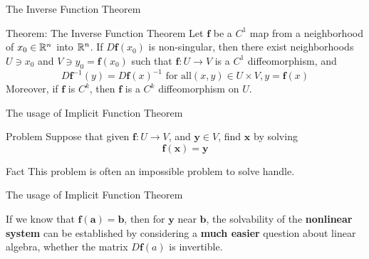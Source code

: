 \begin{frame}{The Inverse Function Theorem}
    \begin{block}{Theorem: The Inverse Function Theorem}
        Let $\mathbf{f}$ be a $C^1$ map from a neighborhood of $x_0 \in \mathbb{R}^n$ into $\mathbb{R}^n$. If $D\mathbf{f}(x_0)$ is non-singular, then there exist neighborhoods $U \ni x_0$ and $V \ni y_0 = \mathbf{f}(x_0)$ such that $ \mathbf{f} : U \rightarrow V$ is a $C^1$ diffeomorphism\footnotemark, and 
        \begin{equation}
            D\mathbf{f}^{-1}(y) = D\mathbf{f}(x)^{-1} \text{ for all} (x, y) \in U \times V, y = \mathbf{f}(x)
        \end{equation}
        Moreover, if $\mathbf{f}$ is $C^k$, then $\mathbf{f}$ is a $C^k$ diffeomorphism on $U$.
    \end{block}
\end{frame}

\begin{frame}{The usage of Implicit Function Theorem}
    \begin{parchment}{Problem}
        Suppose that given $\mathbf{f}: U \rightarrow V$, and $\mathbf{y}  \in V$, find $\mathbf{x}$ by solving 
        \begin{equation}
            \mathbf{f}(\mathbf{x}) = \mathbf{y}
        \end{equation}
    \end{parchment}
    \begin{parchment}{Fact}
        This problem is often an impossible problem to solve handle.
    \end{parchment}
    
\end{frame}
\begin{frame}{The usage of Implicit Function Theorem}
    \begin{parchment}
        If we know that $\mathbf{f}(\mathbf{a}) = \mathbf{b}$, then for $\mathbf{y}$ near $\mathbf{b}$, the solvability of the \textbf{nonlinear system} can be established by considering a \textbf{much easier} question about linear algebra, whether the matrix $D\mathbf{f}(a)$ is invertible.
    \end{parchment}
\end{frame}

